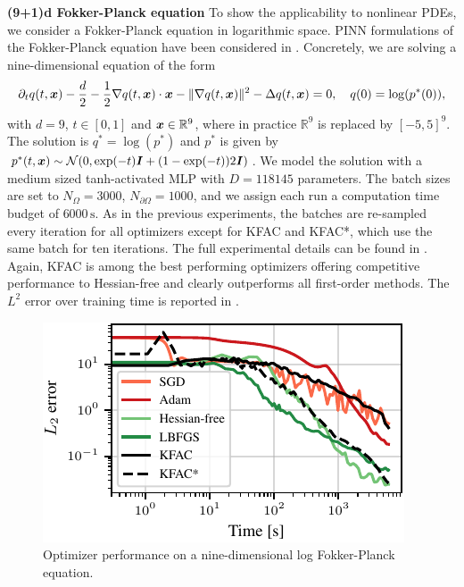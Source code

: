 \textbf{(9+1)d Fokker-Planck equation} To show the applicability to nonlinear PDEs, we consider a Fokker-Planck equation in logarithmic space. PINN formulations of the 
Fokker-Planck equation have been considered in \cite{hu2024score, sun2024dynamical}. Concretely, we are solving a nine-dimensional equation 
of the form
\begin{align}
  \partial_t q(t, {\bm{x}})
  -
  \frac{d}{2}
  -
  \frac12 \nabla q(t,{\bm{x}})\cdot {\bm{x}}
  -
  \lVert \nabla q(t,{\bm{x}}) \rVert^2
  -
  \Delta q(t, {\bm{x}})
  =
  0,
  \quad 
  q(0)
  =
  \log(p^*(0)),
\end{align}
with $d=9$, $t\in[0,1]$ and ${\bm{x}} \in \mathbb R^9$, where in practice $\mathbb R^9$ is replaced by $[-5,5]^9$. 
The solution is $q^* = \log(p^*)$ and $p^*$ is given by 
$p^*(t,{\bm{x}})\sim \mathcal{N}(0, \exp(-t){\bm{I}} + (1-\exp(-t))2{\bm{I}})$. We model the solution with a medium 
sized tanh-activated MLP with $D=\num{118145}$ parameters. The batch sizes are set to 
$N_{\Omega} = \num{3000}$, $N_{\partial\Omega} = \num{1000}$, and we assign each run a computation time
budget of $\num{6000}\,\text{s}$. As in the previous experiments, the batches are re-sampled every iteration 
for all optimizers except for KFAC and KFAC*, which use the same batch for ten iterations. The full experimental details can be found in .
Again, KFAC is among the best performing optimizers offering competitive performance to Hessian-free and clearly outperforms all first-order methods. The $L^2$ error
over training time is reported in .

\begin{figure}
  \centering
  \includegraphics{kfac_pinns_exp/exp43_log_fokker_planck9d_isotropic_gaussian_random/l2_error_over_time.pdf}
  \caption{
    Optimizer performance on a nine-dimensional log Fokker-Planck equation.
  }
  \label{fig:10D-logFP}
\end{figure}

